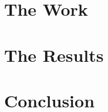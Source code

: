 \documentclass{esda}
\begin{document}
\cleardoublepage
\section{The Work}
\label{sec:curr}


\cleardoublepage
\section{The Results}
\label{sec:res}


\cleardoublepage
\section{Conclusion}
\label{sec:conc}


\cleardoublepage
{}

\end{document}
